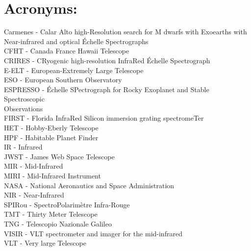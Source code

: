 \documentclass[pdftex,12pt,a4paper]{article}
\begin{document}
\newpage
{}
{}




\newpage
\section*{Acronyms:}
\vspace{2mm}

Carmenes - Calar Alto high-Resolution search for M dwarfs with Exoearths with \\ Near-infrared and optical \'Echelle Spectrographs \vspace{2mm}\\
CFHT - Canada France Hawaii Telescope \vspace{2mm} \vspace{2mm}\\
CRIRES - CRyogenic high-resolution InfraRed \'Echelle Spectrograph \vspace{2mm}\\
E-ELT - European-Extremely Large Telescope \vspace{2mm}\\
ESO - European Southern Observatory\vspace{2mm} \vspace{2mm} \\ 
ESPRESSO - \'Echelle SPectrograph for Rocky Exoplanet and Stable Spectroscopic \\Observations\vspace{2mm}\\
FIRST - Florida InfraRed Silicon immersion grating spectromeTer \vspace{2mm}\\
HET - Hobby-Eberly Telescope \vspace{2mm}\\
HPF - Habitable Planet Finder \vspace{2mm}\\
IR - Infrared \vspace{2mm}\\
JWST - James Web Space Telescope \vspace{2mm}\\
MIR - Mid-Infrared \vspace{2mm}\\
MIRI - Mid-Infrared Instrument \vspace{2mm}\\
NASA - National Aeronautics and Space Administration \vspace{2mm} \\
NIR - Near-Infrared \vspace{2mm}\\
SPIRou - SpectroPolarim\`etre Infra-Rouge \vspace{2mm}\\
TMT - Thirty Meter Telescope\vspace{2mm}\\
TNG - Telescopio Nazionale Galileo \vspace{2mm}\\
VISIR - VLT spectrometer and imager for the mid-infrared \vspace{2mm}\\
VLT - Very large Telescope \vspace{2mm}\\
\end{document}
